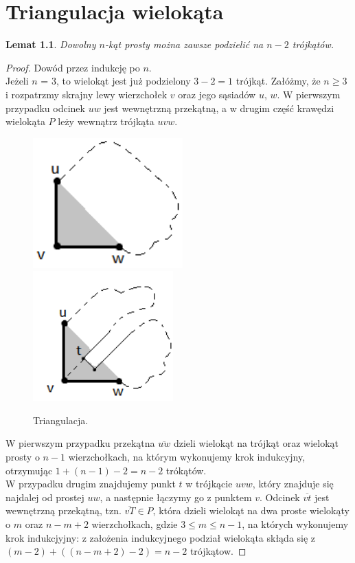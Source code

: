 \documentclass[brudnopis]{xmgr}
\newtheorem{Lemat}{Lemat}
\theoremstyle{definition}
\begin{document}
\chapter{Triangulacja wielokąta}\label{triangulacja}
\begin{Lemat}\label{podzial na trojkaty}
Dowolny $n$-kąt prosty można zawsze podzielić na $n-2$ trójkątów.
\end{Lemat}
\begin{proof}
	Dowód przez indukcję po $n$.
	\\Jeżeli $n$ = 3, to wielokąt jest już podzielony $3 - 2 = 1$ trójkąt.
	Załóżmy, że $n \ge 3$ i rozpatrzmy skrajny lewy wierzchołek $v$ oraz jego sąsiadów $u$, $w$.
	W pierwszym przypadku odcinek $uw$ jest wewnętrzną przekątną, a w drugim część krawędzi wielokąta $P$ leży wewnątrz trójkąta $uvw$.

  \begin{figure}[ht!]
    \centering
    \includegraphics[height=5cm]{rysunki/triangulacja_1.png}
    \includegraphics[height=5cm]{rysunki/triangulacja_2.png}
    \caption{Triangulacja.}
  \end{figure} 
	
	\indent W pierwszym przypadku przekątna $\overline{u w}$ dzieli wielokąt na trójkąt oraz wielokąt prosty o $n - 1$ wierzchołkach, na którym wykonujemy krok indukcyjny, otrzymując $1 + (n - 1) -2 = n - 2$ trókątów.
	\\\indent W przypadku drugim znajdujemy punkt $t$ w trójkącie $uvw$, który znajduje się najdalej od prostej $uw$, a następnie łączymy go z punktem $v$. Odcinek $\overline{v t}$ jest wewnętrzną przekątną, tzn. $\overline{vT} \in P$, która dzieli wielokąt na dwa proste wielokąty o $m$ oraz $n - m + 2$ wierzchołkach, gdzie $3 \le m \le n-1$, na których wykonujemy krok indukcjyjny: z założenia indukcyjnego podział wielokąta skłąda się z $(m - 2) + ((n - m + 2) -2) = n - 2$ trójkątow.
\end{proof}
\end{document}
